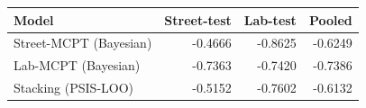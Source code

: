 \begin{tabular}{lrrr}
\toprule
Model & Street-test & Lab-test & Pooled \\
\midrule
Street-MCPT (Bayesian) & -0.4666 & -0.8625 & -0.6249 \\
Lab-MCPT (Bayesian) & -0.7363 & -0.7420 & -0.7386 \\
Stacking (PSIS-LOO) & -0.5152 & -0.7602 & -0.6132 \\
\bottomrule
\end{tabular}
